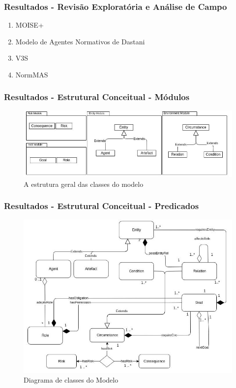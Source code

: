 \documentclass{beamer}
\begin{document}
\begin{frame}
	\frametitle{Resultados - Revisão Exploratória e Análise de Campo}
 	\begin{enumerate}
		\item MOISE+
		\item Modelo de Agentes Normativos de Dastani
		\item V3S 
		\item NormMAS
	\end{enumerate}
\end{frame}

\begin{frame}
	\frametitle{Resultados - Estrutural Conceitual - Módulos}
	\begin{figure}[H]
  		\centering
  			\includegraphics[width=1\linewidth]{../dissertacao/figure/Module.jpeg} 
  		\caption{A estrutura geral das classes do modelo}
  		\label{module}
	\end{figure}
\end{frame}

\begin{frame}
	\frametitle{Resultados - Estrutural Conceitual - Predicados}
	\begin{figure}[H]
  		\centering
  		\includegraphics[width=0.8\linewidth]{../dissertacao/figure/Class.jpeg} 
  		\caption{Diagrama de classes do Modelo}
  		\label{classdiagrama}
	\end{figure}
\end{frame}
\end{document}
